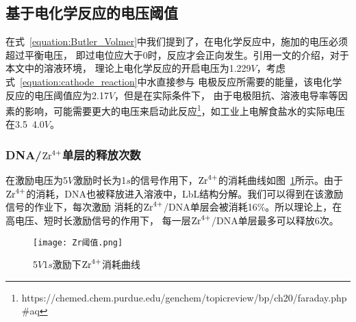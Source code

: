 \subsection{基于电化学反应的电压阈值}

在式~\ref{equation:Butler_Volmer}中我们提到了，在电化学反应中，施加的电压必须超过平衡电压，
即过电位应大于0时，反应才会正向发生。引用\parencite{C9RP00218A}一文的介绍，对于本文中的溶液环境，
理论上电化学反应的开启电压为1.229$V$，考虑式~\ref{equation:cathode_reaction}中水直接参与
电极反应所需要的能量，该电化学反应的电压阈值应为2.17$V$，但是在实际条件下，
由于电极阻抗、溶液电导率等因素的影响，可能需要更大的电压来启动此反应\footnote{
    https://chemed.chem.purdue.edu/genchem/topicreview/bp/ch20/faraday.php\#aq
}，如工业上电解食盐水的实际电压在3.5~4.0$V$。

\subsubsection{DNA/$\ce{Zr^4+}$单层的释放次数}
在激励电压为5$V$激励时长为1$s$的信号作用下，$\ce{Zr^4+}$的消耗曲线如图~\ref{5_1_Zr曲线}所示。由于
$\ce{Zr^4+}$的消耗，DNA也被释放进入溶液中，LbL结构分解。我们可以得到在该激励信号的作业下，每次激励
消耗的$\ce{Zr^4+}$/DNA单层会被消耗16\%。所以理论上，在高电压、短时长激励信号的作用下，
每一层$\ce{Zr^4+}$/DNA单层最多可以释放6次。

\begin{figure}[H]
    \centering
    \texttt{[image: Zr阈值.png]}
    \caption{5$V$1$s$激励下$\ce{Zr^4+}$消耗曲线}
    \label{5_1_Zr曲线}
\end{figure}



